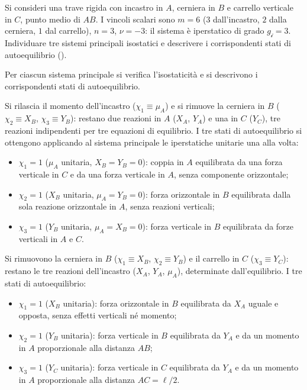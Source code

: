\begin{esempio}
	\label{ex:iper_stat_3}
	Si consideri una trave rigida con incastro in $A$,
	cerniera in $B$ e carrello verticale in $C$, punto
	medio di $AB$. I vincoli scalari sono $m = 6$
	($3$ dall'incastro, $2$ dalla cerniera, $1$ dal
	carrello), $n = 3$, $\nu = -3$: il sistema è
	iperstatico di grado $g_{\mathscr{i}} = 3$.
	Individuare tre sistemi principali isostatici e
	descrivere i corrispondenti stati di autoequilibrio
	().
	



	
	
	\begin{svolgimento}
		
		Per ciascun sistema principale si verifica l'isostaticità
		e si descrivono i corrispondenti stati di autoequilibrio.
		
		Si rilascia il momento dell'incastro ($\chi_1 \equiv \mu_A$)
		e si rimuove la cerniera in $B$
		($\chi_2 \equiv X_B$, $\chi_3 \equiv Y_B$): restano
		due reazioni in $A$ ($X_A$, $Y_A$) e una in $C$ ($Y_C$),
		tre reazioni indipendenti per tre equazioni di equilibrio.
		I tre stati di autoequilibrio si ottengono applicando
		al sistema principale le iperstatiche unitarie una
		alla volta:
		\begin{itemize}[noitemsep]
			\item $\chi_1 = 1$ ($\mu_A$ unitaria, $X_B = Y_B = 0$):
			coppia in $A$ equilibrata da una forza verticale in $C$
			e da una forza verticale in $A$, senza componente
			orizzontale;
			\item $\chi_2 = 1$ ($X_B$ unitaria, $\mu_A = Y_B = 0$):
			forza orizzontale in $B$ equilibrata dalla sola reazione
			orizzontale in $A$, senza reazioni verticali;
			\item $\chi_3 = 1$ ($Y_B$ unitaria, $\mu_A = X_B = 0$):
			forza verticale in $B$ equilibrata da forze verticali
			in $A$ e $C$.
		\end{itemize}
		
		Si rimuovono la cerniera in $B$
		($\chi_1 \equiv X_B$, $\chi_2 \equiv Y_B$) e il carrello
		in $C$ ($\chi_3 \equiv Y_C$): restano le tre reazioni
		dell'incastro ($X_A$, $Y_A$, $\mu_A$), determinate
		dall'equilibrio. I tre stati di autoequilibrio:
		\begin{itemize}[noitemsep]
			\item $\chi_1 = 1$ ($X_B$ unitaria): forza orizzontale
			in $B$ equilibrata da $X_A$ uguale e opposta, senza
			effetti verticali né momento;
			\item $\chi_2 = 1$ ($Y_B$ unitaria): forza verticale
			in $B$ equilibrata da $Y_A$ e da un momento in $A$
			proporzionale alla distanza $AB$;
			\item $\chi_3 = 1$ ($Y_C$ unitaria): forza verticale
			in $C$ equilibrata da $Y_A$ e da un momento in $A$
			proporzionale alla distanza $AC = \ell/2$.
		\end{itemize}
		

\end{svolgimento}
\end{esempio}
